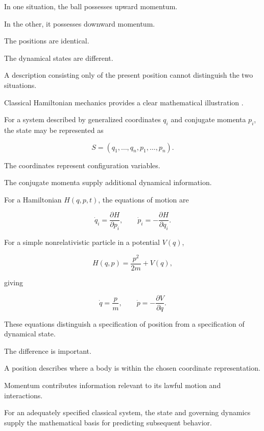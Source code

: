 \documentclass[12pt,onecolumn]{article}
\begin{document}
In one situation, the ball possesses upward momentum.

In the other, it possesses downward momentum.

The positions are identical.

The dynamical states are different.

A description consisting only of the present position cannot distinguish the two situations.

Classical Hamiltonian mechanics provides a clear mathematical illustration \cite{Goldstein2002}.

For a system described by generalized coordinates $q_i$ and conjugate momenta $p_i$, the state may be represented as

\begin{equation}
S=(q_1,\ldots,q_n,p_1,\ldots,p_n).
\end{equation}

The coordinates represent configuration variables.

The conjugate momenta supply additional dynamical information.

For a Hamiltonian $H(q,p,t)$, the equations of motion are

\begin{equation}
\dot q_i=\frac{\partial H}{\partial p_i},
\qquad
\dot p_i=-\frac{\partial H}{\partial q_i}.
\end{equation}

For a simple nonrelativistic particle in a potential $V(q)$,

\begin{equation}
H(q,p)=\frac{p^2}{2m}+V(q),
\end{equation}

giving

\begin{equation}
\dot q=\frac{p}{m},
\qquad
\dot p=-\frac{\partial V}{\partial q}.
\end{equation}

These equations distinguish a specification of position from a specification of dynamical state.

The difference is important.

A position describes where a body is within the chosen coordinate representation.

Momentum contributes information relevant to its lawful motion and interactions.

For an adequately specified classical system, the state and governing dynamics supply the mathematical basis for predicting subsequent behavior.
\end{document}

